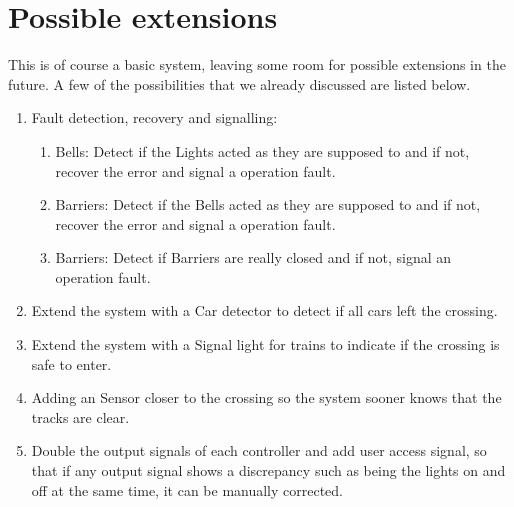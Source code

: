 \documentclass[final]{report}
\begin{document}
\section{Possible extensions}
This is of course a basic system, leaving some room for possible extensions in the future.
A few of the possibilities that we already discussed are listed below.

	\begin{enumerate}
	\item Fault detection, recovery and signalling:
		\begin{enumerate}
			\item Bells: Detect if the Lights acted as they are supposed to and if not, recover the error and signal a operation fault.
			\item Barriers: Detect if the Bells acted as they are supposed to and if not, recover the error and signal a operation fault.
			\item Barriers: Detect if Barriers are really closed and if not, signal an operation fault.
		\end{enumerate}

	\item Extend the system with a Car detector to detect if all cars left the crossing.
	\item Extend the system with a Signal light for trains to indicate if the crossing is safe to enter.
	\item Adding an Sensor closer to the crossing so the system sooner knows that the tracks are clear.
	\item Double the output signals of each controller and add user access signal, so that if any output signal shows a discrepancy such as being the lights on and off at the same time, it can be manually corrected.
	\end{enumerate}
\end{document}
